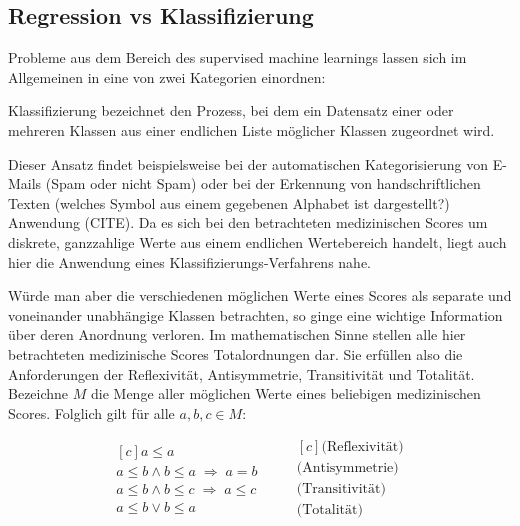 \subsection{Regression vs Klassifizierung}

Probleme aus dem Bereich des supervised machine learnings lassen sich im Allgemeinen in eine von zwei Kategorien einordnen:

Klassifizierung bezeichnet den Prozess, bei dem ein Datensatz einer oder mehreren Klassen aus einer endlichen Liste möglicher Klassen zugeordnet wird. 

Dieser Ansatz findet beispielsweise bei der automatischen Kategorisierung von E-Mails (Spam oder nicht Spam) oder bei der Erkennung von handschriftlichen Texten (welches Symbol aus einem gegebenen Alphabet ist dargestellt?) Anwendung (CITE). Da es sich bei den betrachteten medizinischen Scores um diskrete, ganzzahlige Werte aus einem endlichen Wertebereich handelt, liegt auch hier die Anwendung eines Klassifizierungs-Verfahrens nahe.

Würde man aber die verschiedenen möglichen Werte eines Scores als separate und voneinander unabhängige Klassen betrachten, so ginge eine wichtige Information über deren Anordnung verloren. Im mathematischen Sinne stellen alle hier betrachteten medizinische Scores Totalordnungen dar. Sie erfüllen also die Anforderungen der Reflexivität, Antisymmetrie, Transitivität und Totalität. Bezeichne $M$ die Menge aller möglichen Werte eines beliebigen medizinischen Scores. Folglich gilt für alle $a,b,c \in M$:

\begin{equation*}
    \begin{aligned}[c]
        a \leq a\\
        a \leq b \land b \leq a \; \Rightarrow \; a=b\\
        a \leq b \land b \leq c \; \Rightarrow \; a \leq c\\
        a \leq b \lor b \leq a
    \end{aligned}
    \qquad
    \begin{aligned}[c]
        \text{(Reflexivität)}\\
        \text{(Antisymmetrie)}\\
        \text{(Transitivität)}\\
        \text{(Totalität)}
    \end{aligned}
\end{equation*}


